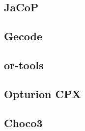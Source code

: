 \subsection{JaCoP}


\subsection{Gecode}


\subsection{or-tools}


\subsection{Opturion CPX}




\subsection{Choco3}


